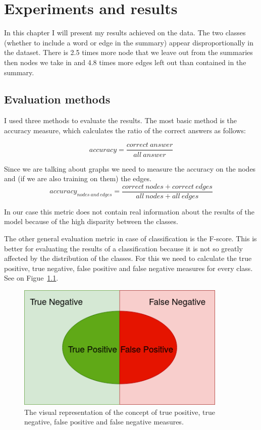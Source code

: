 \chapter{Experiments and results}\label{sect:Experiments}

In this chapter I will present my results achieved on the data. The two classes (whether to include a word or edge in the summary) appear disproportionally in the dataset. There is 2.5 times more node that we leave out from the summaries then nodes we take in and 4.8 times more edges left out than contained in the summary.

\section{Evaluation methods}

I used three methods to evaluate the results. The most basic method is the accuracy measure, which calculates the ratio of the correct answers as follows:

\[accuracy = \frac{correct\ answer}{all\ answer}\]

Since we are talking about graphs we need to measure the accuracy on the nodes and (if we are also training on them) the edges.
\[accuracy_{nodes\ and\ edges} = \frac{correct\ nodes + correct\ edges}{all\ nodes + all\ edges}\]

In our case this metric does not contain real information about the results of the model because of the high disparity between the classes.

The other general evaluation metric in case of classification is the F-score. This is better for evaluating the results of a classification because it is not so greatly affected by the distribution of the classes. For this we need to calculate the true positive, true negative, false positive and false negative measures for every class. See on Figue~\ref{fig:TP_TN_FP_FN}.

\begin{figure}[!ht]
	\centering
	\includegraphics[width=100mm, keepaspectratio]{figures/F_score.png}
	\caption{The visual representation of the concept of true positive, true negative, false positive and false negative measures.}
	\label{fig:TP_TN_FP_FN}
\end{figure}


